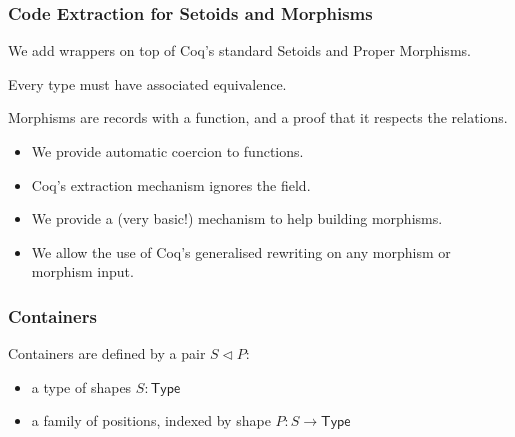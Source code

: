 \begin{frame}
  \frametitle{Code Extraction for Setoids and Morphisms}
  We add wrappers on top of Coq's standard Setoids and Proper Morphisms.
  \vspace{.6cm}

    Every type must have  associated equivalence.
  \vspace{.6cm}

    Morphisms are records with a function, and a proof that it respects
    the relations.
  \vspace{.3cm}
      \begin{itemize}
        \item<2-> We provide automatic coercion to functions.
        \item<2-> Coq's extraction mechanism ignores the  field.
        \item<3-> We provide a (very basic!) mechanism to help building morphisms.
        \item<4-> We allow the use of Coq's \alert{generalised rewriting} on any
          morphism or morphism input. 
      \end{itemize}
\end{frame}

\begin{frame}
  \frametitle{Containers}

  Containers are defined by a  pair $S \triangleleft P$:
  \begin{itemize}
    \item a type of \alert{shapes} $S : \mathsf{Type}$
    \item a \alert{family} of positions, indexed by shape $P : S \to \mathsf{Type}$
  \end{itemize}

  \vspace{.7cm}
\end{frame}


